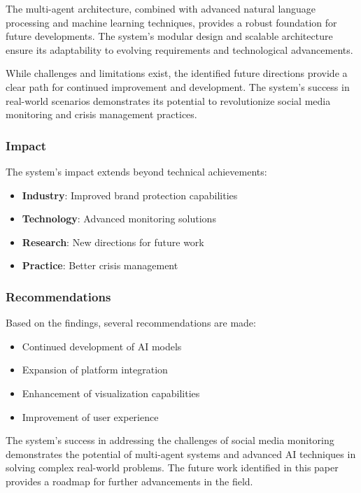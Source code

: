 The multi-agent architecture, combined with advanced natural language processing and machine learning techniques, provides a robust foundation for future developments. The system's modular design and scalable architecture ensure its adaptability to evolving requirements and technological advancements.

While challenges and limitations exist, the identified future directions provide a clear path for continued improvement and development. The system's success in real-world scenarios demonstrates its potential to revolutionize social media monitoring and crisis management practices.

\subsubsection{Impact}
The system's impact extends beyond technical achievements:

\begin{itemize}
    \item \textbf{Industry}: Improved brand protection capabilities
    \item \textbf{Technology}: Advanced monitoring solutions
    \item \textbf{Research}: New directions for future work
    \item \textbf{Practice}: Better crisis management
\end{itemize}

\subsubsection{Recommendations}
Based on the findings, several recommendations are made:

\begin{itemize}
    \item Continued development of AI models
    \item Expansion of platform integration
    \item Enhancement of visualization capabilities
    \item Improvement of user experience
\end{itemize}

The system's success in addressing the challenges of social media monitoring demonstrates the potential of multi-agent systems and advanced AI techniques in solving complex real-world problems. The future work identified in this paper provides a roadmap for further advancements in the field. 